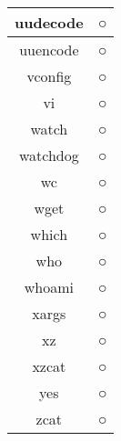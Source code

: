 \begin{longtable}{cc}
uudecode & ○ \\ \hline
uuencode & ○ \\ \hline
vconfig & ○ \\ \hline
vi & ○ \\ \hline
watch & ○ \\ \hline
watchdog & ○ \\ \hline
wc & ○ \\ \hline
wget & ○ \\ \hline
which & ○ \\ \hline
who & ○ \\ \hline
whoami & ○ \\ \hline
xargs & ○ \\ \hline
xz & ○ \\ \hline
xzcat & ○ \\ \hline
yes & ○ \\ \hline
zcat & ○ \\ \hline
\end{longtable}
















